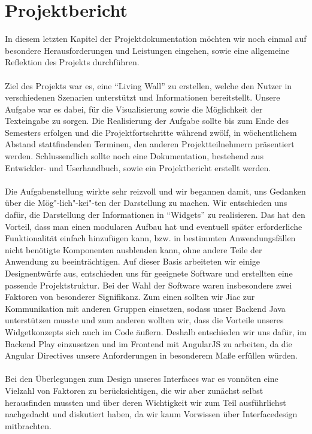\documentclass[10pt,a4paper]{report}
\begin{document}
\chapter{Projektbericht}
	In diesem letzten Kapitel der Projektdokumentation möchten wir noch einmal auf besondere Herausforderungen und Leistungen eingehen, sowie eine allgemeine Reflektion des Projekts durchführen.\\\\
	Ziel des Projekts war es, eine "`Living Wall"' zu erstellen, welche den Nutzer in verschiedenen Szenarien unterstützt und Informationen bereitstellt. Unsere Aufgabe war es dabei, für die Visualisierung sowie die Möglichkeit der Texteingabe zu sorgen. Die Realisierung der Aufgabe sollte bis zum Ende des Semesters erfolgen und die Projektfortschritte während zwölf, in wöchentlichem Abstand stattfindenden Terminen, den anderen Projektteilnehmern präsentiert werden. Schlussendlich sollte noch eine Dokumentation, bestehend aus Entwickler- und Userhandbuch, sowie ein Projektbericht erstellt werden.\\\\
	Die Aufgabenstellung wirkte sehr reizvoll und wir begannen damit, uns Gedanken über die Mög"-lich"-kei"-ten der Darstellung zu machen. Wir entschieden uns dafür, die Darstellung der Informationen in "`Widgets"' zu realisieren. Das hat den Vorteil, dass man einen modularen Aufbau hat und eventuell später erforderliche Funktionalität einfach hinzufügen kann, bzw. in bestimmten Anwendungsfällen nicht benötigte Komponenten ausblenden kann, ohne andere Teile der Anwendung zu beeinträchtigen. Auf dieser Basis arbeiteten wir einige Designentwürfe aus, entschieden uns für geeignete Software und erstellten eine passende Projektstruktur. Bei der Wahl der Software waren insbesondere zwei Faktoren von besonderer Signifikanz. Zum einen sollten wir Jiac zur Kommunikation mit anderen Gruppen einsetzen, sodass unser Backend Java unterstützen musste und zum anderen wollten wir, dass die Vorteile unseres Widgetkonzepts sich auch im Code äußern. Deshalb entschieden wir uns dafür, im Backend Play einzusetzen und im Frontend mit AngularJS zu arbeiten, da die Angular Directives unsere Anforderungen in besonderem Maße erfüllen würden.\\\\
	Bei den Überlegungen zum Design unseres Interfaces war es vonnöten eine Vielzahl von Faktoren zu berücksichtigen, die wir aber zunächst selbst herausfinden mussten und über deren Wichtigkeit wir zum Teil ausführlichst nachgedacht und diskutiert haben, da wir kaum Vorwissen über Interfacedesign mitbrachten.\\\\
\end{document}
